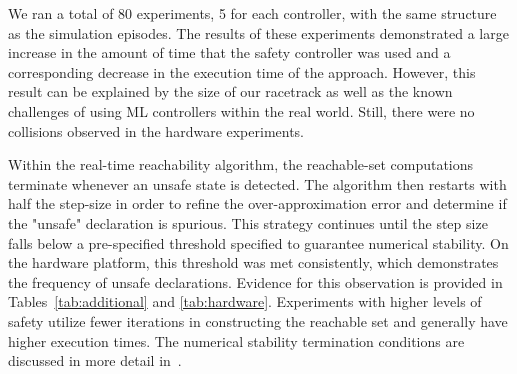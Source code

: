 \documentclass[manuscript,screen,review]{acmart}
\begin{document}



We ran a total of 80 experiments, 5 for each controller, with the same structure as the simulation episodes. The results of these experiments demonstrated a large increase in the amount of time that the safety controller was used and a corresponding decrease in the execution time of the approach. However, this result can be explained by the size of our racetrack as well as the known challenges of using ML controllers within the real world. Still, there were no collisions observed in the hardware experiments.

Within the real-time reachability algorithm, the reachable-set computations terminate whenever an unsafe state is detected. The algorithm then restarts with half the step-size in order to refine the over-approximation error and determine if the "unsafe" declaration is spurious. This strategy continues until the step size falls below a pre-specified threshold specified to guarantee numerical stability. On the hardware platform, this threshold was met consistently, which demonstrates the frequency of unsafe declarations. Evidence for this observation is provided in Tables~\ref{tab:additional} and \ref{tab:hardware}. Experiments with higher levels of safety utilize fewer iterations in constructing the reachable set and generally have higher execution times. 
The numerical stability termination conditions are discussed in more detail in~\cite{Johnson2016}.
\end{document}
